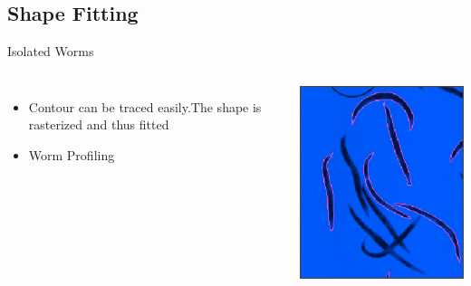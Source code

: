 \documentclass{beamer}
\begin{document}
\subsection{Shape Fitting}
\begin{frame}{Isolated Worms}

\begin{columns}[c]
\column{2.4in}
\begin{itemize}
\item Contour can be traced easily.The shape is rasterized 
and thus fitted \pause
\item Worm Profiling 
\end{itemize}
\column{2.2in}
\includegraphics[scale=0.5]{iso}
\end{columns}

\end{frame}

\end{document}
